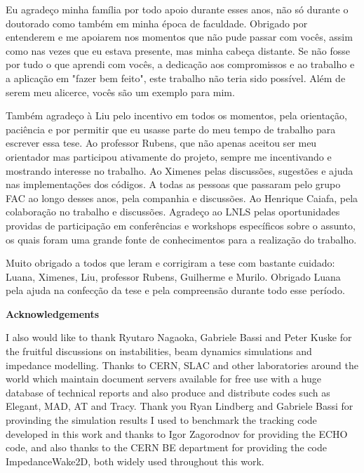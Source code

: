\begin{agradecimentos}[Agradecimentos]
    Eu agradeço minha família por todo apoio durante esses anos, não só durante o doutorado como também em minha época de faculdade. Obrigado por entenderem e me apoiarem nos momentos que não pude passar com vocês, assim como nas vezes que eu estava presente, mas minha cabeça distante. Se não fosse por tudo o que aprendi com vocês, a dedicação aos compromissos e ao trabalho e a aplicação em "fazer bem feito", este trabalho não teria sido possível. Além de serem meu alicerce, vocês são um exemplo para mim.

    Também agradeço à Liu pelo incentivo em todos os momentos, pela orientação, paciência e por permitir que eu usasse parte do meu tempo de trabalho para escrever essa tese. Ao professor Rubens, que não apenas aceitou ser meu orientador mas participou ativamente do projeto, sempre me incentivando e mostrando interesse no trabalho. Ao Ximenes pelas discussões, sugestões e ajuda nas implementações dos códigos. A todas as pessoas que passaram pelo grupo FAC ao longo desses anos, pela companhia e discussões. Ao Henrique Caiafa, pela colaboração no trabalho e discussões. Agradeço ao LNLS pelas oportunidades providas de participação em conferências e workshops específicos sobre o assunto, os quais foram uma grande fonte de conhecimentos para a realização do trabalho.

    Muito obrigado a todos que leram e corrigiram a tese com bastante cuidado: Luana, Ximenes, Liu, professor Rubens, Guilherme e Murilo. Obrigado Luana pela ajuda na confecção da tese e pela compreensão durante todo esse período.

    \vspace{5mm}
    {\centering \Large \textbf{Acknowledgements}}

    I also would like to thank Ryutaro Nagaoka, Gabriele Bassi and Peter Kuske for the fruitful discussions on instabilities, beam dynamics simulations and impedance modelling. Thanks to CERN, SLAC and other laboratories around the world which maintain document servers available for free use with a huge database of technical reports and also produce and distribute codes such as Elegant, MAD, AT and Tracy. Thank you Ryan Lindberg and Gabriele Bassi for provinding the simulation results I used to benchmark the tracking code developed in this work and thanks to Igor Zagorodnov for providing the ECHO code, and also thanks to the CERN BE department for providing the code ImpedanceWake2D, both widely used throughout this work.
\end{agradecimentos}

